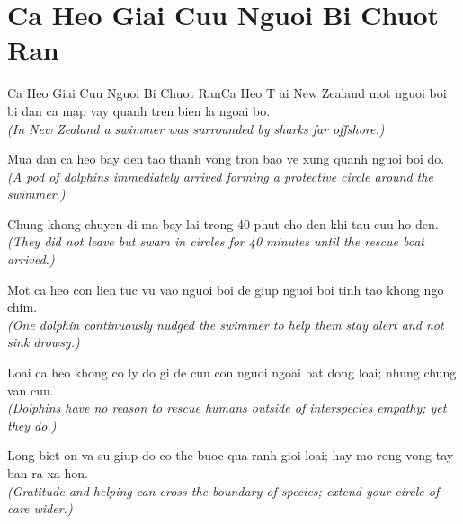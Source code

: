 \section{Ca Heo Giai Cuu Nguoi Bi Chuot Ran}
\begin{truyen}{Ca Heo Giai Cuu Nguoi Bi Chuot Ran}{Ca Heo}
T ai New Zealand mot nguoi boi bi dan ca map vay quanh tren bien la ngoai bo.\\
\textit{(In New Zealand a swimmer was surrounded by sharks far offshore.)}

Mua dan ca heo bay den tao thanh vong tron bao ve xung quanh nguoi boi do.\\
\textit{(A pod of dolphins immediately arrived forming a protective circle around the swimmer.)}

Chung khong chuyen di ma bay lai trong 40 phut cho den khi tau cuu ho den.\\
\textit{(They did not leave but swam in circles for 40 minutes until the rescue boat arrived.)}

Mot ca heo con lien tuc vu vao nguoi boi de giup nguoi boi tinh tao khong ngo chim.\\
\textit{(One dolphin continuously nudged the swimmer to help them stay alert and not sink drowsy.)}

Loai ca heo khong co ly do gi de cuu con nguoi ngoai bat dong loai; nhung chung van cuu.\\
\textit{(Dolphins have no reason to rescue humans outside of interspecies empathy; yet they do.)}

\end{truyen}
\begin{baihoc}
  Long biet on va su giup do co the buoc qua ranh gioi loai; hay mo rong vong tay ban ra xa hon.\\
  \textit{(Gratitude and helping can cross the boundary of species; extend your circle of care wider.)}
\end{baihoc}

